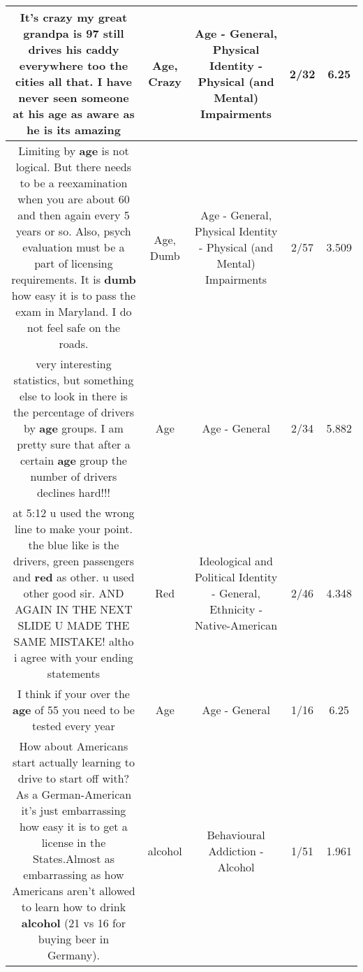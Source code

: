 \documentclass[11pt]{article}
\newlength\mylength
\begin{document}
\begin{center}
\begin{longtable}{|C{.65\mylength}|C{.30\mylength}|C{.12\mylength}|C{.12\mylength}|C{.12\mylength}|}
  \small It's \textbf{crazy} my great grandpa is 97 still drives his caddy everywhere too the cities all that. I have never seen someone at his \textbf{age} as aware as he is its amazing\normalsize   & Age, Crazy & Age - General, Physical Identity - Physical (and Mental) Impairments & 2/32 & 6.25 \\  \hline
  \small Limiting by \textbf{age} is not logical. But there needs to be a reexamination when you are about 60 and then again every 5 years or so. Also, psych evaluation must be a part of licensing requirements. It is \textbf{dumb} how easy it is to pass the exam in Maryland. I do not feel safe on the roads.\normalsize   & Age, Dumb & Age - General, Physical Identity - Physical (and Mental) Impairments & 2/57 & 3.509 \\  \hline
  \small very interesting statistics, but something else to look in there is the percentage of drivers by \textbf{age} groups. I am pretty sure that after a certain \textbf{age} group the number of drivers declines hard!!!\normalsize   & Age & Age - General & 2/34 & 5.882 \\  \hline
  \small at 5:12 u used the wrong line to make your point. the blue like is the drivers, green passengers and \textbf{r\textbf{ed}} as other. u used other good sir. AND AGAIN IN THE NEXT SLIDE U MADE THE SAME MISTAKE! altho i agree with your ending statements\normalsize   & Red &  Ideological and Political Identity - General, Ethnicity - Native-American & 2/46 & 4.348 \\  \hline
  \small I think if your over the \textbf{age} of 55 you need to be tested every year\normalsize   & Age & Age - General & 1/16 & 6.25 \\  \hline
  \small How about Americans start actually learning to drive to start off with? As a German-American it's just embarrassing how easy it is to get a license in the States.Almost as embarrassing as how Americans aren't allowed to learn how to drink \textbf{alcohol} (21 vs 16 for buying beer in Germany).\normalsize   & alcohol & Behavioural Addiction - Alcohol & 1/51 & 1.961 \\  \hline

\end{longtable}
\end{center}
\end{document}
